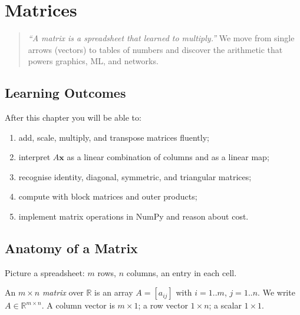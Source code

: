 \chapter{Matrices}
\label{ch:matrices}

\begin{quote}
\emph{``A matrix is a spreadsheet that learned to multiply.''} We move from single arrows (vectors) to tables of numbers and discover the arithmetic that powers graphics, ML, and networks.
\end{quote}

\noindent{}
\vspace{0.4em}

\section*{Learning Outcomes}
After this chapter you will be able to:
\begin{enumerate}[label=(L\arabic*)]
    \item add, scale, multiply, and transpose matrices fluently;
    \item interpret $A\mathbf{x}$ as a linear combination of columns and as a linear map;
    \item recognise identity, diagonal, symmetric, and triangular matrices;
    \item compute with block matrices and outer products;
    \item implement matrix operations in NumPy and reason about cost.
\end{enumerate}

\section{Anatomy of a Matrix}
\label{sec:anatomy}
Picture a spreadsheet: $m$ rows, $n$ columns, an entry in each cell.

\begin{definition}[Matrix]
An $m\times n$ \emph{matrix} over $\mathbb{R}$ is an array $A=[a_{ij}]$ with $i=1..m$, $j=1..n$. We write $A\in\mathbb{R}^{m\times n}$. A column vector is $m\times1$; a row vector $1\times n$; a scalar $1\times1$.
\end{definition}

